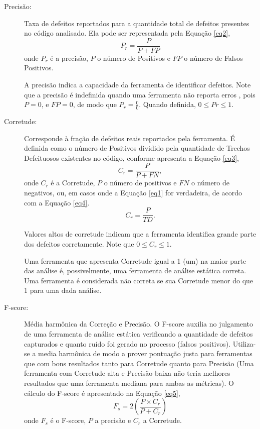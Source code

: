 \begin{description}
    \item[Precisão:] Taxa de defeitos reportados para a quantidade total de defeitos presentes no código analisado.  Ela pode ser representada pela Equação \eqref{eq2},
\begin{equation}\label{eq2}
  P_r = \frac{P}{P + FP}
\end{equation}
  onde $P_r$ é a precisão, $P$ o número de Positivos e $FP$ o número de Falsos Positivos.

  A precisão indica a capacidade da ferramenta de identificar defeitos. Note que a precisão é indefinida quando uma ferramenta não reporta erros \cite{nsa}, pois $P = 0$, e $FP = 0$, de modo que $P_r = \frac{0}{0}$. Quando definida, $0 \leq Pr \leq 1$.

  \item[Corretude:] Corresponde à fração de defeitos reais reportados pela ferramenta. É definida como o número de Positivos dividido pela quantidade de Trechos Defeituosos existentes no código, conforme apresenta a Equação \eqref{eq3},
\begin{equation}\label{eq3}
  C_r = \frac{P}{P + FN},
\end{equation}
  onde $C_r$ é a Corretude, $P$ o número de positivos e $FN$ o número de negativos, ou, em casos onde a Equação \eqref{eq1} for verdadeira, de acordo com a Equação \eqref{eq4}.
\begin{equation}\label{eq4}
  C_r = \frac{P}{TD}.
\end{equation}

  Valores altos de corretude indicam que a ferramenta identifica grande parte dos defeitos corretamente. Note que $0 \leq C_r \leq 1$.

  Uma ferramenta que apresenta Corretude igual a 1 (um) na maior parte das análise é, possivelmente, uma ferramenta de análise estática correta. Uma ferramenta é considerada não correta se sua Corretude  menor do que 1 para uma dada análise.

  \item[F-score:] Média harmônica da Correção e Precisão. O F-score auxilia no julgamento de uma ferramenta de análise estática verificando a quantidade de defeitos capturados e quanto ruído foi gerado no processo (falsos positivos). Utiliza-se a media harmônica de modo a prover pontuação justa para ferramentas que com bons resultados tanto para Corretude quanto para Precisão (Uma ferramenta com Corretude alta e Precisão baixa não teria melhores resultados que uma ferramenta mediana para ambas as métricas). O cálculo do F-score é apresentado na Equação \eqref{eq5},
\begin{equation}\label{eq5}
  F_s = 2\left(\frac{P \times C_r}{P + C_r}\right)
\end{equation}
onde $F_s$ é o F-score, $P$ a precisão e $C_r$ a Corretude.
\end{description}

